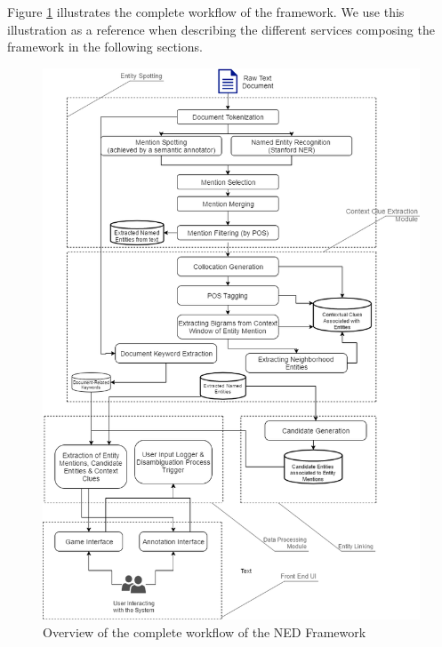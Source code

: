 Figure \ref{fig:workflow} illustrates the complete workflow of the framework. We use this illustration as a reference when describing the different services composing the framework in the following sections.


\begin{figure}[]
  \includegraphics[width=\linewidth]{figures/workflow-diagram-v4.png}
  \caption{Overview of the complete workflow of the NED Framework}
  \label{fig:workflow}
\end{figure}
